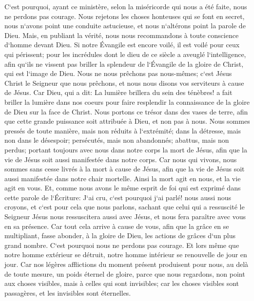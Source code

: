 \verse C`est pourquoi, ayant ce ministère, selon la miséricorde qui nous a été faite, nous ne perdons pas courage. 
\verse Nous rejetons les choses honteuses qui se font en secret, nous n`avons point une conduite astucieuse, et nous n`altérons point la parole de Dieu. Mais, en publiant la vérité, nous nous recommandons à toute conscience d`homme devant Dieu. 
\verse Si notre Évangile est encore voilé, il est voilé pour ceux qui périssent; 
\verse pour les incrédules dont le dieu de ce siècle a aveuglé l`intelligence, afin qu`ils ne vissent pas briller la splendeur de l`Évangile de la gloire de Christ, qui est l`image de Dieu. 
\verse Nous ne nous prêchons pas nous-mêmes; c`est Jésus Christ le Seigneur que nous prêchons, et nous nous disons vos serviteurs à cause de Jésus. 
\verse Car Dieu, qui a dit: La lumière brillera du sein des ténèbres! a fait briller la lumière dans nos coeurs pour faire resplendir la connaissance de la gloire de Dieu sur la face de Christ. 
\verse Nous portons ce trésor dans des vases de terre, afin que cette grande puissance soit attribuée à Dieu, et non pas à nous. 
\verse Nous sommes pressés de toute manière, mais non réduits à l`extrémité; dans la détresse, mais non dans le désespoir; 
\verse persécutés, mais non abandonnés; abattus, mais non perdus; 
\verse portant toujours avec nous dans notre corps la mort de Jésus, afin que la vie de Jésus soit aussi manifestée dans notre corps. 
\verse Car nous qui vivons, nous sommes sans cesse livrés à la mort à cause de Jésus, afin que la vie de Jésus soit aussi manifestée dans notre chair mortelle. 
\verse Ainsi la mort agit en nous, et la vie agit en vous. 
\verse Et, comme nous avons le même esprit de foi qui est exprimé dans cette parole de l`Écriture: J`ai cru, c`est pourquoi j`ai parlé! nous aussi nous croyons, et c`est pour cela que nous parlons, 
\verse sachant que celui qui a ressuscité le Seigneur Jésus nous ressuscitera aussi avec Jésus, et nous fera paraître avec vous en sa présence. 
\verse Car tout cela arrive à cause de vous, afin que la grâce en se multipliant, fasse abonder, à la gloire de Dieu, les actions de grâces d`un plus grand nombre. 
\verse C`est pourquoi nous ne perdons pas courage. Et lors même que notre homme extérieur se détruit, notre homme intérieur se renouvelle de jour en jour. 
\verse Car nos légères afflictions du moment présent produisent pour nous, au delà de toute mesure, 
\verse un poids éternel de gloire, parce que nous regardons, non point aux choses visibles, mais à celles qui sont invisibles; car les choses visibles sont passagères, et les invisibles sont éternelles. 

